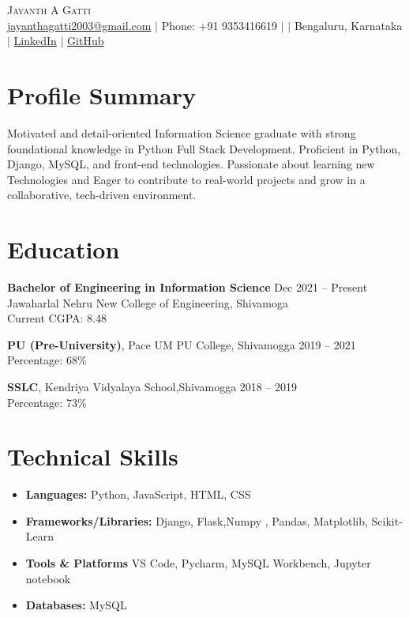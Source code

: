 \documentclass[a4paper,10pt]{article}
\begin{document}
\begin{center}
    {\Huge \scshape Jayanth A Gatti} \\ \vspace{2pt}
    \href{mailto:jayanthagatti2003@gmail.com}{jayanthagatti2003@gmail.com} $|$ Phone: +91 9353416619 $|$ $|$ Bengaluru, Karnataka $|$ 
    \href{https://www.linkedin.com/in/jayanth-a-gatti-836988227/}{LinkedIn} $|$ 
    \href{https://github.com/jayanthagatti}{GitHub}
\end{center}

\section*{Profile Summary}
Motivated and detail-oriented Information Science graduate with strong foundational knowledge in Python Full Stack Development. Proficient in Python, Django, MySQL, and front-end technologies. Passionate about learning new Technologies and Eager to contribute to real-world projects and grow in a collaborative, tech-driven environment. 

\section{Education}
\textbf{Bachelor of Engineering in Information Science} \hfill Dec 2021 -- Present \\ Jawaharlal Nehru New College of Engineering, Shivamoga \\
Current CGPA: 8.48

\vspace{4pt}
\textbf{PU (Pre-University)}, Pace UM PU College, Shivamogga \hfill 2019 -- 2021 \\
Percentage: 68\%

\vspace{4pt}
\textbf{SSLC}, Kendriya Vidyalaya School,Shivamogga \hfill 2018 -- 2019 \\
Percentage: 73\%

\section{Technical Skills}
\begin{itemize}[leftmargin=0.5cm, itemsep=1pt]
    \item \textbf{Languages:} Python, JavaScript, HTML, CSS
    \item \textbf{Frameworks/Libraries:} Django, Flask,Numpy , Pandas, Matplotlib, Scikit-Learn
    \item \textbf{Tools \& Platforms} VS Code, Pycharm, MySQL Workbench, Jupyter notebook  
    \item \textbf{Databases:} MySQL
\end{itemize}
\end{document}
